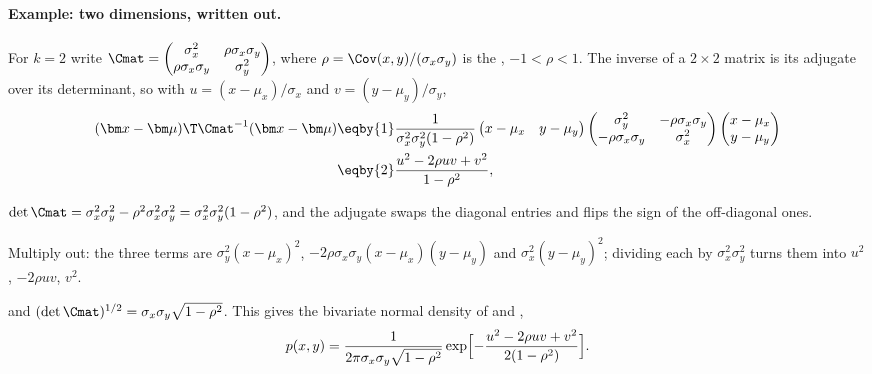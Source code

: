 \paragraph{Example: two dimensions, written out.} For $k=2$ write $\Cmat=\begin{pmatrix}\sigma_x^2&\rho\sigma_x\sigma_y\\ \rho\sigma_x\sigma_y&\sigma_y^2\end{pmatrix}$, where $\rho=\Cov(x,y)/(\sigma_x\sigma_y)$ is the , $-1<\rho<1$. The inverse of a $2\times2$ matrix is its adjugate over its determinant, so with $u=(x-\mu_x)/\sigma_x$ and $v=(y-\mu_y)/\sigma_y$,
\begin{align}
  (\bm x-\bm\mu)\T\Cmat^{-1}(\bm x-\bm\mu)
  &\eqby{1} \frac{1}{\sigma_x^2\sigma_y^2(1-\rho^2)}
    \begin{pmatrix}x-\mu_x& y-\mu_y\end{pmatrix}
    \begin{pmatrix}\sigma_y^2&-\rho\sigma_x\sigma_y\\-\rho\sigma_x\sigma_y&\sigma_x^2\end{pmatrix}
    \begin{pmatrix}x-\mu_x\\ y-\mu_y\end{pmatrix} \nonumber\\
  &\eqby{2} \frac{u^2-2\rho uv+v^2}{1-\rho^2} ,
  \label{2b:eq:bvn-quad}
\end{align}
\begin{explain}
  \item $\det\Cmat=\sigma_x^2\sigma_y^2-\rho^2\sigma_x^2\sigma_y^2=\sigma_x^2\sigma_y^2(1-\rho^2)$, and the adjugate swaps the diagonal entries and flips the sign of the off-diagonal ones.
  \item Multiply out: the three terms are $\sigma_y^2(x-\mu_x)^2$, $-2\rho\sigma_x\sigma_y(x-\mu_x)(y-\mu_y)$ and $\sigma_x^2(y-\mu_y)^2$; dividing each by $\sigma_x^2\sigma_y^2$ turns them into $u^2$, $-2\rho uv$, $v^2$.
\end{explain}
and $(\det\Cmat)^{1/2}=\sigma_x\sigma_y\sqrt{1-\rho^2}$. This gives the bivariate normal density of  and ,
\begin{equation}
  p(x,y)=\frac{1}{2\pi\sigma_x\sigma_y\sqrt{1-\rho^2}}\exp\Bigl[-\frac{u^2-2\rho uv+v^2}{2(1-\rho^2)}\Bigr].
  \label{2b:eq:bvn}
\end{equation}
